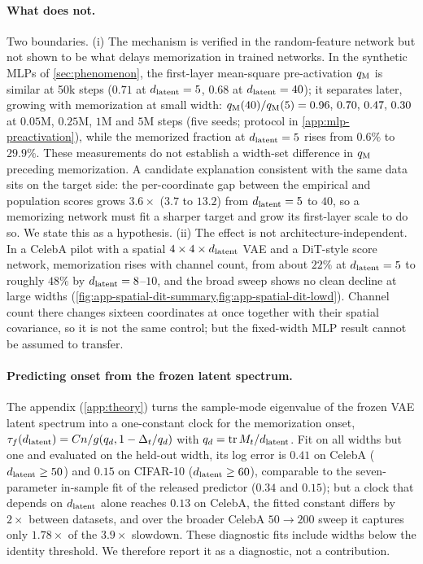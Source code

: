 \paragraph{What does not.}
Two boundaries. (i) The mechanism is verified in the random-feature network but not shown to be what delays memorization in trained networks. In the synthetic MLPs of \cref{sec:phenomenon}, the first-layer mean-square pre-activation $q_{\rm M}$ is similar at 50k steps ($0.71$ at $d_{\mathrm{latent}}=5$, $0.68$ at $d_{\mathrm{latent}}=40$); it separates later, growing with memorization at small width: $q_{\rm M}(40)/q_{\rm M}(5)=0.96,\,0.70,\,0.47,\,0.30$ at $0.05$M, $0.25$M, $1$M and $5$M steps (five seeds; protocol in \cref{app:mlp-preactivation}), while the memorized fraction at $d_{\mathrm{latent}}=5$ rises from $0.6\%$ to $29.9\%$. These measurements do not establish a width-set difference in $q_{\rm M}$ preceding memorization. A candidate explanation consistent with the same data sits on the target side: the per-coordinate gap between the empirical and population scores grows $3.6\times$ ($3.7$ to $13.2$) from $d_{\mathrm{latent}}=5$ to $40$, so a memorizing network must fit a sharper target and grow its first-layer scale to do so. We state this as a hypothesis. (ii) The effect is not architecture-independent. In a CelebA pilot with a spatial $4\times4\times d_{\mathrm{latent}}$ VAE and a DiT-style score network, memorization rises with channel count, from about $22\%$ at $d_{\mathrm{latent}}=5$ to roughly $48\%$ by $d_{\mathrm{latent}}=8$--$10$, and the broad sweep shows no clean decline at large widths (\cref{fig:app-spatial-dit-summary,fig:app-spatial-dit-lowd}). Channel count there changes sixteen coordinates at once together with their spatial covariance, so it is not the same control; but the fixed-width MLP result cannot be assumed to transfer.

\paragraph{Predicting onset from the frozen latent spectrum.}\label{sec:predictor}
The appendix (\cref{app:theory}) turns the sample-mode eigenvalue of the frozen VAE latent spectrum into a one-constant clock for the memorization onset, $\tau_f(d_{\mathrm{latent}})=Cn/g(q_d,1-\Delta_t/q_d)$ with $q_d=\operatorname{tr}M_t/d_{\mathrm{latent}}$. Fit on all widths but one and evaluated on the held-out width, its log error is $0.41$ on CelebA ($d_{\mathrm{latent}}\ge50$) and $0.15$ on CIFAR-10 ($d_{\mathrm{latent}}\ge60$), comparable to the seven-parameter in-sample fit of the released predictor ($0.34$ and $0.15$); but a clock that depends on $d_{\mathrm{latent}}$ alone reaches $0.13$ on CelebA, the fitted constant differs by $2\times$ between datasets, and over the broader CelebA $50\to200$ sweep it captures only $1.78\times$ of the $3.9\times$ slowdown. These diagnostic fits include widths below the identity threshold. We therefore report it as a diagnostic, not a contribution.
